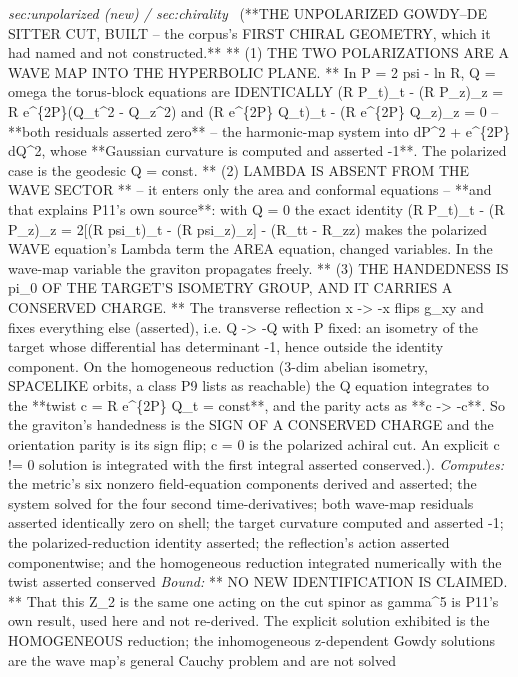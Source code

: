 \begin{description}
\textit{sec:unpolarized (new) / sec:chirality} \ (**THE UNPOLARIZED GOWDY--DE SITTER CUT, BUILT -- the corpus's FIRST CHIRAL GEOMETRY, which it had named and not constructed.** ** (1) THE TWO POLARIZATIONS ARE A WAVE MAP INTO THE HYPERBOLIC PLANE. ** In P = 2 psi - ln R, Q = omega the torus-block equations are IDENTICALLY (R P\_t)\_t - (R P\_z)\_z = R e\textasciicircum{}\{2P\}(Q\_t\textasciicircum{}2 - Q\_z\textasciicircum{}2) and (R e\textasciicircum{}\{2P\} Q\_t)\_t - (R e\textasciicircum{}\{2P\} Q\_z)\_z = 0 -- **both residuals asserted zero** -- the harmonic-map system into dP\textasciicircum{}2 + e\textasciicircum{}\{2P\} dQ\textasciicircum{}2, whose **Gaussian curvature is computed and asserted -1**. The polarized case is the geodesic Q = const. ** (2) LAMBDA IS ABSENT FROM THE WAVE SECTOR ** -- it enters only the area and conformal equations -- **and that explains P11's own source**: with Q = 0 the exact identity (R P\_t)\_t - (R P\_z)\_z = 2[(R psi\_t)\_t - (R psi\_z)\_z] - (R\_tt - R\_zz) makes the polarized WAVE equation's Lambda term the AREA equation, changed variables. In the wave-map variable the graviton propagates freely. ** (3) THE HANDEDNESS IS pi\_0 OF THE TARGET'S ISOMETRY GROUP, AND IT CARRIES A CONSERVED CHARGE. ** The transverse reflection x -> -x flips g\_xy and fixes everything else (asserted), i.e. Q -> -Q with P fixed: an isometry of the target whose differential has determinant -1, hence outside the identity component. On the homogeneous reduction (3-dim abelian isometry, SPACELIKE orbits, a class P9 lists as reachable) the Q equation integrates to the **twist c = R e\textasciicircum{}\{2P\} Q\_t = const**, and the parity acts as **c -> -c**. So the graviton's handedness is the SIGN OF A CONSERVED CHARGE and the orientation parity is its sign flip; c = 0 is the polarized achiral cut. An explicit c != 0 solution is integrated with the first integral asserted conserved.). 
\emph{Computes:} the metric's six nonzero field-equation components derived and asserted; the system solved for the four second time-derivatives; both wave-map residuals asserted identically zero on shell; the target curvature computed and asserted -1; the polarized-reduction identity asserted; the reflection's action asserted componentwise; and the homogeneous reduction integrated numerically with the twist asserted conserved
 \emph{Bound:} ** NO NEW IDENTIFICATION IS CLAIMED. ** That this Z\_2 is the same one acting on the cut spinor as gamma\textasciicircum{}5 is P11's own result, used here and not re-derived. The explicit solution exhibited is the HOMOGENEOUS reduction; the inhomogeneous z-dependent Gowdy solutions are the wave map's general Cauchy problem and are not solved

\end{description}
